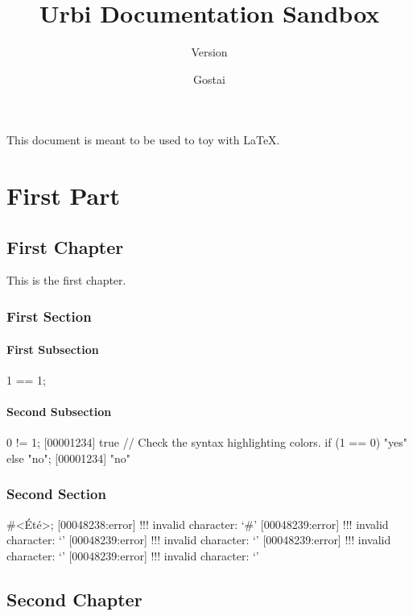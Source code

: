 \documentclass[openright,twoside,11pt]{book}
\title{Urbi Documentation Sandbox}
\subtitle{Version \VcsDescription}
\author{Gostai}
\begin{document}
\maketitle

This document is meant to be used to toy with \LaTeX{}.

\tableofcontents
\part{First Part}
\chapter{First Chapter}

This is the first chapter.

\section{First Section}

\subsection{First Subsection}
\begin{urbiassert}[firstnumber=1]
1 == 1;
\end{urbiassert}

\subsection{Second Subsection}
\begin{urbiscript}
0 != 1;
[00001234] true
// Check the syntax highlighting colors.
if (1 == 0) "yes" else "no";
[00001234] "no"
\end{urbiscript}

\section{Second Section}
\begin{urbiunchecked}[escapeinside=<>]
#<Été>;
[00048238:error] !!! invalid character: `#'
[00048239:error] !!! invalid character: `'
[00048239:error] !!! invalid character: `'
[00048239:error] !!! invalid character: `'
[00048239:error] !!! invalid character: `'
\end{urbiunchecked}

\chapter{Second Chapter}
\end{document}
